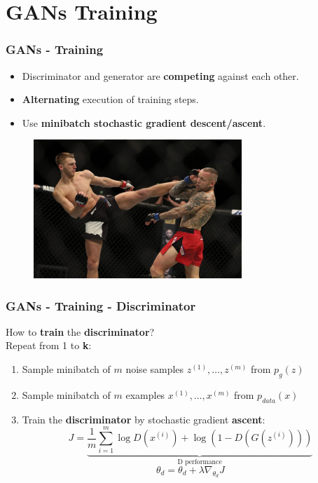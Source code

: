 \documentclass{beamer}
\begin{document}
\section{GANs Training}

\begin{frame}
	\frametitle{GANs - Training}
	\begin{itemize}
		\item Discriminator and generator are \textbf{competing} against each other.
		\item \textbf{Alternating} execution of training steps.
		\item Use \textbf{minibatch stochastic gradient descent/ascent}.
	\end{itemize}
	\begin{figure}
		\centering
		\includegraphics[width=0.7\textwidth]{images/fight.jpg}
	\end{figure}
\end{frame}

\begin{frame}
	\frametitle{GANs - Training - Discriminator}
	How to \textbf{train} the \textbf{discriminator}? \\
	Repeat from 1 to \textbf{k}:
		\begin{enumerate}
			\item<1-> \alert<+>{Sample minibatch of $m$ noise samples ${z^{(1)},\dots,z^{(m)}}$ from $p_g(z)$}
			\item<2-> \alert<+>{Sample minibatch of $m$ examples ${x^{(1)},\dots,x^{(m)}}$ from $p_{data}(x)$}
			\item<3-> \alert<+>{Train the \textbf{discriminator} by stochastic gradient \textbf{ascent}:
		$$
			J =  \underbrace{\frac{1}{m} \sum_{i=1}^{m} \log D(x^{(i)}) + \log(1 - D(G(z^{(i)})))}_{\text{D performance}}
		$$ 
	$$
	\theta_d = \theta_d + \lambda \nabla_{\theta_d} J
	$$}
		\end{enumerate}
\end{frame}
\end{document}

